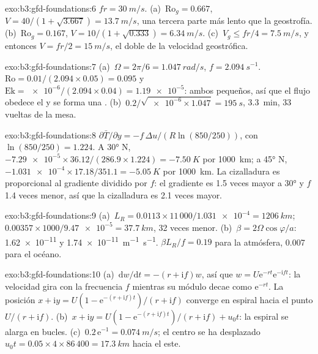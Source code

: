 \begin{solution}{exo:b3:gfd-foundations:6}
$fr = \qty{30}{m/s}$. (a)~$\mathrm{Ro}_g = 0.667$, $V = 40/(1 + \sqrt{3.667})
= \qty{13.7}{m/s}$, una tercera parte más lento que la geostrofía. (b)~$\mathrm{Ro}_g =
0.167$, $V = 10/(1 + \sqrt{0.333}) = \qty{6.34}{m/s}$. (c)~$V_g \le fr/4 =
\qty{7.5}{m/s}$, y entonces $V = fr/2 = \qty{15}{m/s}$, el doble de la
velocidad geostrófica.
\end{solution}

\begin{solution}{exo:b3:gfd-foundations:7}
(a)~$\Omega = 2\pi/6 = \qty{1.047}{rad/s}$, $f = \qty{2.094}{s^{-1}}$.
$\mathrm{Ro} = 0.01/(2.094\times0.05) = 0.095$ y $\mathrm{Ek} =
\num{e-6}/(2.094\times0.04) = \num{1.19e-5}$: ambos pequeños, así que el flujo
obedece el  y se forma una . (b)~$0.2/\sqrt{\num{e-6}
\times1.047} = \qty{195}{s}$, \qty{3.3}{min}, 33 vueltas de la mesa.
\end{solution}

\begin{solution}{exo:b3:gfd-foundations:8}
$\partial\bar T/\partial y = -f\,\Delta u/(R\ln(850/250))$, con
$\ln(850/250) = 1.224$. A \ang{30} N, $-\num{7.29e-5}\times36.12/(286.9
\times1.224) = \qty{-7.50}{K}$ por \qty{1000}{km}; a \ang{45} N,
$-\num{1.031e-4}\times17.18/351.1 = \qty{-5.05}{K}$ por \qty{1000}{km}. La
cizalladura es proporcional al gradiente dividido por $f$: el gradiente es 1.5
veces mayor a \ang{30} y $f$ 1.4 veces menor, así que la cizalladura es 2.1 veces
mayor.
\end{solution}

\begin{solution}{exo:b3:gfd-foundations:9}
(a)~$L_R = 0.0113\times11\,000/\num{1.031e-4} = \qty{1206}{km}$;
$0.00357\times1000/\num{9.47e-5} = \qty{37.7}{km}$, 32 veces menor.
(b)~$\beta = 2\Omega\cos\varphi/a$: \num{1.62e-11} y
\qty{1.74e-11}{m^{-1}.s^{-1}}. $\beta L_R/f = 0.19$ para la atmósfera, 0.007
para el océano.
\end{solution}

\begin{solution}{exo:b3:gfd-foundations:10}
(a)~$\mathrm dw/\mathrm dt = -(r + \mathrm if)w$, así que $w = U\mathrm
e^{-rt}\mathrm e^{-\mathrm ift}$: la velocidad gira con la frecuencia $f$ mientras
su módulo decae como $\mathrm e^{-rt}$. La posición $x + \mathrm iy =
U(1 - \mathrm e^{-(r + \mathrm if)t})/(r + \mathrm if)$ converge en espiral hacia el
punto $U/(r + \mathrm if)$. (b)~$x + \mathrm iy = U(1 - \mathrm e^{-(r +
\mathrm if)t})/(r + \mathrm if) + u_0t$: la espiral se alarga en bucles.
(c)~$0.2\,\mathrm e^{-1} = \qty{0.074}{m/s}$; el centro se ha desplazado $u_0t =
0.05\times4\times86\,400 = \qty{17.3}{km}$ hacia el este.
\end{solution}

